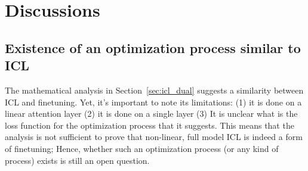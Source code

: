 \documentclass[11pt]{article}
\begin{document}



\section{Discussions}
\subsection{Existence of an optimization process similar to ICL}
The mathematical analysis in Section~\ref{sec:icl_dual} suggests a similarity between ICL and finetuning.
Yet, it's important to note its limitations: (1) it is done on a linear attention layer (2) it is done on a single layer
(3) It is unclear what is the loss function for the optimization process that it suggests.
This means that the analysis is not sufficient to prove that non-linear, full model ICL is indeed a form of finetuning;
Hence, whether such an optimization process (or any kind of process) exists is still an open question.
\end{document}
